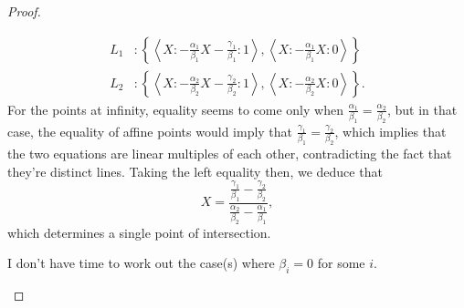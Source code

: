 \documentclass[12pt]{article}
\theoremstyle{definition}
\begin{document}
\begin{proof}
\begin{enumerate}[label=(\alph*)]
\begin{align*}
			      L_1 & : \left\lbrace \left\langle X : -\frac{\alpha_1}{\beta_1}X - \frac{\gamma_1}{\beta_1} : 1 \right\rangle, \left\langle X : -\frac{\alpha_1}{\beta_1}X : 0 \right\rangle \right\rbrace  \\
			      L_2 & : \left\lbrace \left\langle X : -\frac{\alpha_2}{\beta_2}X - \frac{\gamma_2}{\beta_2} : 1 \right\rangle, \left\langle X : -\frac{\alpha_2}{\beta_2}X : 0 \right\rangle \right\rbrace.
		      \end{align*}
		      For the points at infinity, equality seems to come only when $\frac{\alpha_1}{\beta_1} = \frac{\alpha_2}{\beta_2}$, but in that case, the equality of affine points would imply that $\frac{\gamma_1}{\beta_1} = \frac{\gamma_2}{\beta_2}$, which implies that the two equations are linear multiples of each other, contradicting the fact that they're distinct lines.
		      Taking the left equality then, we deduce that \begin{equation*}
			      X = \frac{\frac{\gamma_1}{\beta_1} - \frac{\gamma_2}{\beta_2}}{\frac{\alpha_2}{\beta_2}-\frac{\alpha_1}{\beta_1}},
		      \end{equation*}
          which determines a single point of intersection.

          I don't have time to work out the case(s) where $\beta_i = 0$ for some $i$.
	\end{enumerate}
\end{proof}
\end{document}
